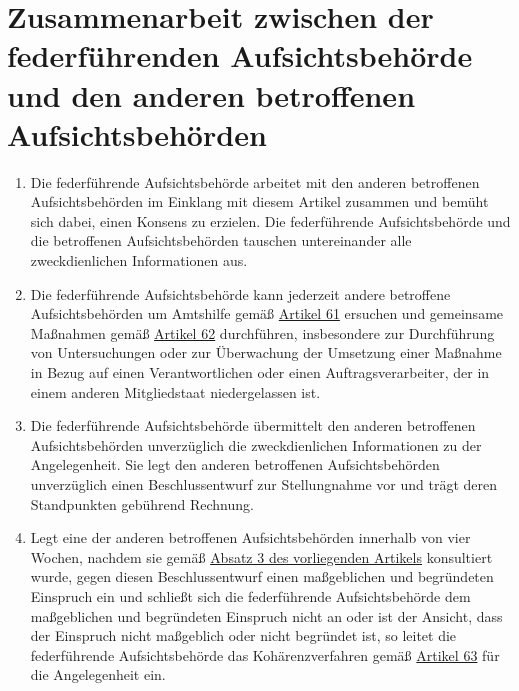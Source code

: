 \chapter{Zusammenarbeit zwischen der federführenden Aufsichtsbehörde und den anderen betroffenen Aufsichtsbehörden}
\label{ch:60}


\begin{enumerate}

  \item Die federführende Aufsichtsbehörde arbeitet mit den anderen betroffenen Aufsichtsbehörden im Einklang mit diesem
   Artikel zusammen und bemüht sich dabei, einen Konsens zu erzielen. Die federführende Aufsichtsbehörde und die
   betroffenen Aufsichtsbehörden tauschen untereinander alle zweckdienlichen Informationen aus.
  \label{itm:60-1}

  \item Die federführende Aufsichtsbehörde kann jederzeit andere betroffene Aufsichtsbehörden um Amtshilfe gemäß
  \hyperref[ch:61]{Artikel 61} ersuchen und gemeinsame Maßnahmen gemäß \hyperref[ch:62]{Artikel 62} durchführen,
   insbesondere zur Durchführung von Untersuchungen oder zur Überwachung der Umsetzung einer Maßnahme in Bezug auf
   einen Verantwortlichen oder einen Auftragsverarbeiter, der in einem anderen Mitgliedstaat niedergelassen ist.
  \label{itm:60-2}

  \item Die federführende Aufsichtsbehörde übermittelt den anderen betroffenen Aufsichtsbehörden unverzüglich die
   zweckdienlichen Informationen zu der Angelegenheit. Sie legt den anderen betroffenen Aufsichtsbehörden unverzüglich
   einen Beschlussentwurf zur Stellungnahme vor und trägt deren Standpunkten gebührend Rechnung.
  \label{itm:60-3}

  \item Legt eine der anderen betroffenen Aufsichtsbehörden innerhalb von vier Wochen, nachdem sie gemäß \hyperref
   [itm:60-3]{Absatz 3 des vorliegenden Artikels} konsultiert wurde, gegen diesen Beschlussentwurf einen maßgeblichen
   und begründeten Einspruch ein und schließt sich die federführende Aufsichtsbehörde dem maßgeblichen und begründeten
   Einspruch nicht an oder ist der Ansicht, dass der Einspruch nicht maßgeblich oder nicht begründet ist, so leitet die
   federführende Aufsichtsbehörde das Kohärenzverfahren gemäß \hyperref[ch:63]{Artikel 63} für die Angelegenheit ein.
  \label{itm:60-4}


\end{enumerate}
